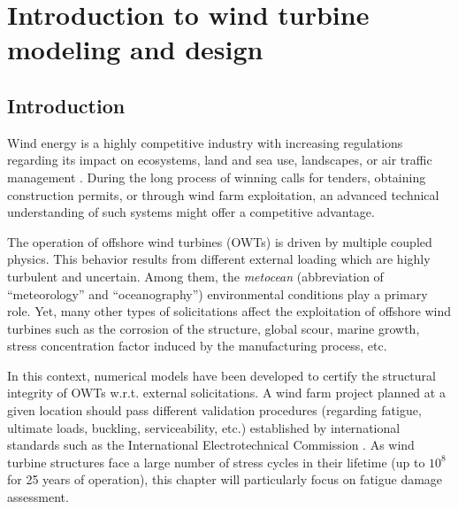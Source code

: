 \cleardoublepage
\chapter{Introduction to wind turbine modeling and design}
\label{chpt:2}
\hfill
\localtableofcontents
\newpage

\section{Introduction}

Wind energy is a highly competitive industry with increasing regulations regarding its impact on ecosystems, land and sea use, landscapes, or air traffic management \citep{eolien_en_mer_2022}. 
During the long process of winning calls for tenders, obtaining construction permits, or through wind farm exploitation, an advanced technical understanding of such systems might offer a competitive advantage. 

The operation of offshore wind turbines (OWTs) is driven by multiple coupled physics. 
This behavior results from different external loading which are highly turbulent and uncertain. 
Among them, the \textit{metocean} (abbreviation of ``meteorology'' and ``oceanography'') environmental conditions play a primary role. 
Yet, many other types of solicitations affect the exploitation of offshore wind turbines such as the corrosion of the structure, global scour, marine growth, stress concentration factor induced by the manufacturing process, etc. 

In this context, numerical models have been developed to certify the structural integrity of OWTs w.r.t. external solicitations. 
A wind farm project planned at a given location should pass different validation procedures (regarding fatigue, ultimate loads, buckling, serviceability, etc.) established by international standards such as the International Electrotechnical Commission \citep{iec_2019}. 
As wind turbine structures face a large number of stress cycles in their lifetime (up to $10^8$ for 25 years of operation), this chapter will particularly focus on fatigue damage assessment.

